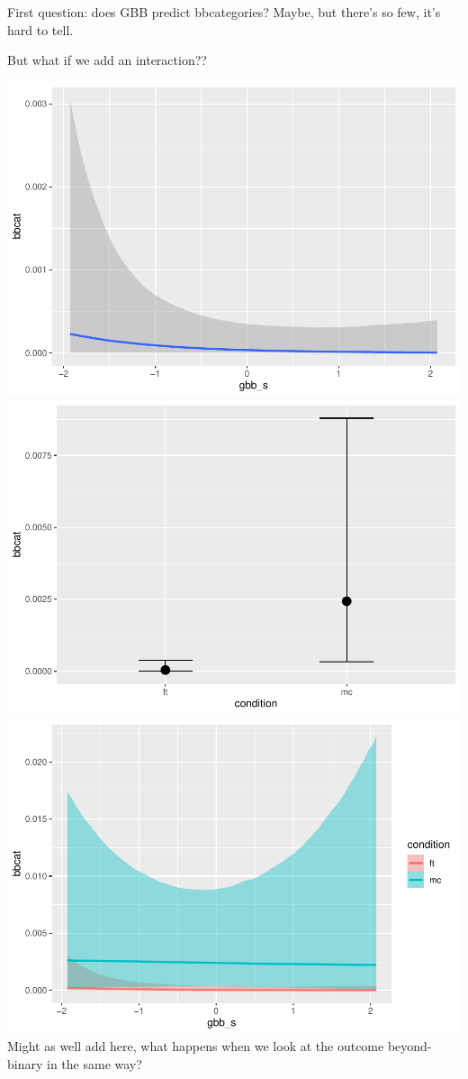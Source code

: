 \documentclass[
  man]{apa7}
\begin{document}
First question: does GBB predict bbcategories? Maybe, but there's so few, it's hard to tell.

But what if we add an interaction??

\includegraphics{resp_opts_manus23022_files/figure-latex/unnamed-chunk-6-1.pdf} \includegraphics{resp_opts_manus23022_files/figure-latex/unnamed-chunk-6-2.pdf} \includegraphics{resp_opts_manus23022_files/figure-latex/unnamed-chunk-6-3.pdf}
Might as well add here, what happens when we look at the outcome beyond-binary in the same way?
\end{document}
